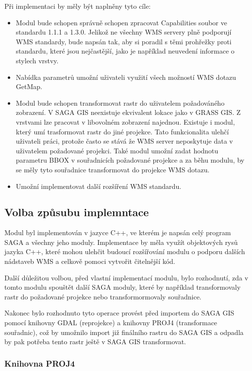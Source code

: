 \documentclass[a4paper,12pt]{article}
\begin{document}
Při implementaci by měly být naplněny tyto cíle:
\begin{itemize}
\item  Modul bude schopen správně schopen zpracovat Capabilities soubor ve standardu 1.1.1 a 1.3.0.  Jelikož ne všechny WMS servery plně podporují WMS standardy, bude napsán tak, aby si poradil s těmi prohřežky proti standardu, které jsou nejčastější, jako je například neuvedení informace o stylech vrstvy.  
\item Nabídka parametrů umožní uživateli využití všech možností WMS dotazu GetMap.
\item Modul bude schopen transformovat rastr do uživatelem požadováného zobrazení. V SAGA GIS neexistuje ekvivalent lokace jako v GRASS GIS. Z vrstvami lze pracovat v libovolném zobrazení najednou. Existuje i modul,
      který umí trasformovat rastr do jiné projekce. Tato funkcionalita ulehčí uživateli práci, protože často se stává že WMS server neposkytuje data v uživatelem požadované projekci. 
Také modul umožní zadat hodnotu parametru BBOX v souřadnicích požadované projekce a za běhu modulu, by se měly tyto souřadnice transformovat do projekce WMS dotazu.
\item Umožní implementovat další rozšíření WMS standardu. 
\end{itemize}


\subsection{Volba způsubu implemntace}

Modul byl implementován v jazyce C++, ve kterém je napsán celý program SAGA a všechny jeho moduly. Implementace by měla využít objektových rysů jazyka C++, které mohou ulehčit budoucí rozšířování 
modulu o podporu dalších nádstaveb WMS a celkově pomoci vytvořit čitelnější kód. 

Další důležitou volbou, před vlastní implementací modulu, bylo rozhodnutí, zda v tomto modulu spouštět další SAGA moduly, které  by například transformovaly rastr do požadované projekce nebo transformormovaly souřadnice. 

Nakonec bylo rozhodnuto tyto operace provést před importem do SAGA GIS pomocí knihovny GDAL (reprojekce) a knihovny PROJ4 (transformace souřadnic), což by umožnilo import již finálního rastru do SAGA GIS a odpadla by 
pak potřeba tento rastr ještě v SAGA GIS transformovat. 

\subsubsection{Knihovna PROJ4}
\end{document}
